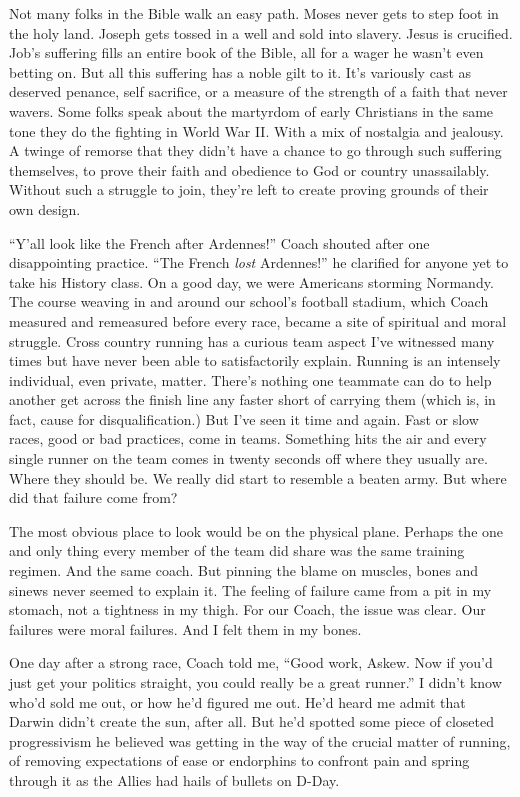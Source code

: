 \documentclass[12pt, oneside]{memoir}
\begin{document}
Not many folks in the Bible walk an easy path.
Moses never gets to step foot in the holy land.
Joseph gets tossed in a well and sold into slavery.
Jesus is crucified.
Job's suffering fills an entire book of the Bible, all for a wager
he wasn't even betting on.
But all this suffering has a noble gilt to it.
It's variously cast as deserved penance, self sacrifice, or a measure
of the strength of a faith that never wavers.
Some folks speak about the martyrdom of early Christians in the same
tone they do the fighting in World War II.
With a mix of nostalgia and jealousy.
A twinge of remorse that they didn't have a chance to go through such
suffering themselves, to prove their faith and obedience to God or
country unassailably.
Without such a struggle to join, they're left to create proving
grounds of their own design.

``Y'all look like the French after Ardennes!'' Coach shouted after one
disappointing practice.
``The French \textit{lost} Ardennes!'' he clarified for anyone yet to
take his History class.
On a good day, we were Americans storming Normandy.
The course weaving in and around our school's football
stadium, which Coach measured and remeasured before every race, became
a site of spiritual and moral struggle.
Cross country running has a curious team aspect I've witnessed many times
but have never been able to satisfactorily explain.
Running is an intensely individual, even private, matter.
There's nothing one teammate can do to help another get across the
finish line any faster short of carrying them (which is, in fact,
cause for disqualification.)
But I've seen it time and again.
Fast or slow races, good or bad practices, come in teams.
Something hits the air and every single runner on the team comes in
twenty seconds off where they usually are.
Where they should be.
We really did start to resemble a beaten army.
But where did that failure come from?

The most obvious place to look would be on the physical plane.
Perhaps the one and only thing every member of the team did share was
the same training regimen.
And the same coach.
But pinning the blame on muscles, bones and sinews never seemed to
explain it.
The feeling of failure came from a pit in my stomach, not a tightness
in my thigh.
For our Coach, the issue was clear.
Our failures were moral failures.
And I felt them in my bones.

One day after a strong race, Coach told me, ``Good work,
Askew. Now if you'd just get your politics straight, you could really
be a great runner.''
I didn't know who'd sold me out, or how he'd figured me out.
He'd heard me admit that Darwin didn't create the sun, after all.
But he'd spotted some piece of closeted progressivism he believed
was getting in the way of the crucial matter of running, of removing
expectations of ease or endorphins to confront pain and spring through
it as the Allies had hails of bullets on D-Day. 
\end{document}
